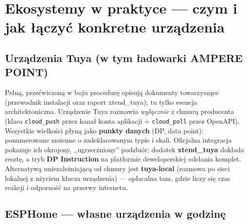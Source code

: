 \documentclass[11pt,a4paper]{article}
\begin{document}
\begin{center}
\end{center}

\section{Ekosystemy w praktyce --- czym i jak łączyć konkretne urządzenia}
\label{sec:ekosystemy}

\subsection{Urządzenia Tuya (w tym ładowarki AMPERE POINT)}

Pełną, przećwiczoną w boju procedurę opisują dokumenty towarzyszące (przewodnik instalacji oraz raport xtend\_tuya); tu tylko esencja architektoniczna. Urządzenie Tuya rozmawia \emph{wyłącznie} z chmurą producenta (klasa \texttt{cloud\_push} przez kanał konta aplikacji + \texttt{cloud\_poll} przez OpenAPI). Wszystkie wielkości płyną jako \textbf{punkty danych} (DP, data point): ponumerowane zmienne o zadeklarowanym typie i skali. Oficjalna integracja pokazuje ich okrojony, ,,ugrzeczniony'' podzbiór; dodatek \textbf{xtend\_tuya} dokłada resztę, a tryb \textbf{DP Instruction} na platformie deweloperskiej odsłania komplet. Alternatywą uniezależniającą od chmury jest \textbf{tuya-local} (rozmowa po sieci lokalnej z użyciem klucza urządzenia) --- opłacalna tam, gdzie liczy się czas reakcji i odporność na przerwy internetu.

\subsection{ESPHome --- własne urządzenia w godzinę}
\label{sec:esphome}
\end{document}
